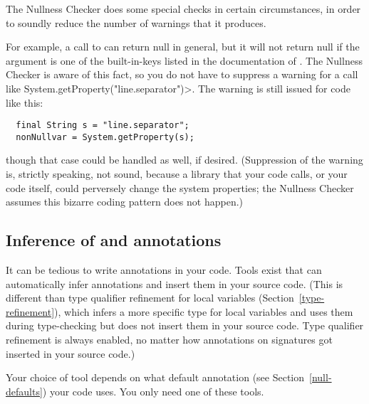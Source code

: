 The Nullness Checker does some special checks in certain circumstances, in
order to soundly reduce the number of warnings that it produces.

For example, a call to
can return null in general, but it will not return null if the argument is
one of the built-in-keys listed in the documentation of
.
The Nullness Checker is aware of this fact, so you do not have to suppress
a warning for a call like \<System.getProperty("line.separator")>.  The
warning is still issued for code like this:

\begin{Verbatim}
  final String s = "line.separator";
  nonNullvar = System.getProperty(s);
\end{Verbatim}

\noindent
though that case could be handled as well, if desired.
(Suppression of the warning is, strictly speaking, not sound, because a
library that your code calls, or your code itself, could perversely change
the system properties; the Nullness Checker assumes this bizarre coding
pattern does not happen.)


\subsection{Inference of  and  annotations\label{nullness-inference}}

It can be tedious to write annotations in your code.  Tools exist that
can automatically infer annotations and insert them in your source code.
(This is different than type qualifier refinement for local variables
(Section~\ref{type-refinement}), which infers a more specific type for
local variables and uses them during type-checking but does not insert them
in your source code.  Type qualifier refinement is always enabled, no
matter how annotations on signatures got inserted in your source code.)

Your choice of tool depends on what default annotation (see
Section~\ref{null-defaults}) your code uses.  You only need one of these tools.

